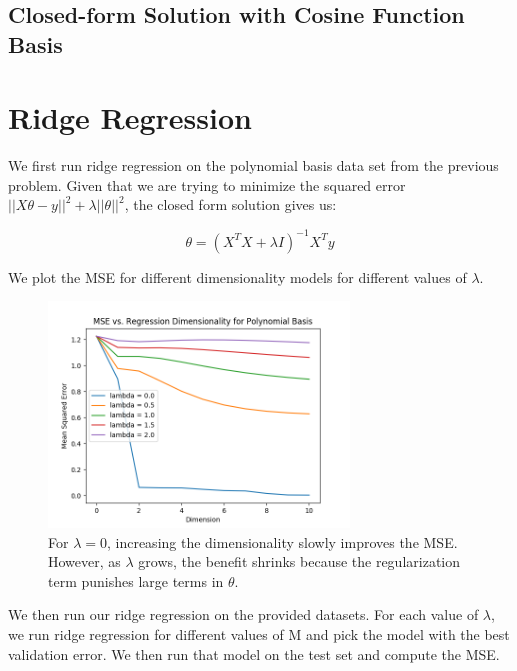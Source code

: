\documentclass{article}
\begin{document}
\subsection{Closed-form Solution with Cosine Function Basis}

\section{Ridge Regression}

We first run ridge regression on the polynomial basis data set from the previous problem. Given that we are trying to minimize the squared error  $\vert \vert X\theta - y\vert \vert ^2 + \lambda \vert \vert \theta \vert \vert ^2$, the closed form solution gives us:

\[  \theta = (X^{T}X + \lambda I)^{-1} X^{T} y \]

We plot the MSE for different dimensionality models for different values of $\lambda$.

\begin{figure}[H]
  \centering
  \includegraphics[width = 3.15in]{../P3/figs/poly_basis.png}
  \caption*{For $\lambda = 0$, increasing the dimensionality slowly improves the MSE. However, as $\lambda$ grows, the benefit shrinks because the regularization term punishes large terms in $\theta$.}
\end{figure}

We then run our ridge regression on the provided datasets. For each value of $\lambda$, we run ridge regression for different values of M and pick the model with the best validation error. We then run that model on the test set and compute the MSE.
\end{document}
